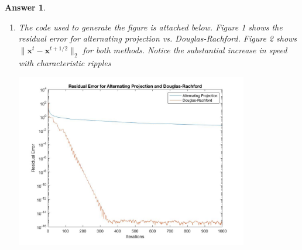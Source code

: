\documentclass[12pt]{article}
\theoremstyle{colon}
\newtheorem*{answer}{Answer}
\begin{document}
\begin{answer}
\begin{enumerate}[label=\alph*)]
			Putting it all together, the Douglas-Rachford splitting is
			\begin{gather*}
				\bm{x}^{t+1/2} = \max (0, p_i^t) \quad \forall i \\
				\bm{\lambda}^{t+1/2} = \frac{\bm{q}^t - \eta \bm{b}}{1+\eta} \\
				\begin{bmatrix}
					\bm{x}^{t+1} \\
					\bm{\lambda}^{t+1}
				\end{bmatrix} = \begin{bmatrix}
					\bm{I} & \eta \bm{A}^T \\
					-\eta \bm{A} & \bm{I}
				\end{bmatrix}^{-1} \begin{bmatrix}
					2 \bm{x}^{t+1/2} - \bm{p}^t \\
					2 \bm{\lambda}^{t+1/2} - \bm{q}^t
				\end{bmatrix} \\
				\bm{p}^{t+1} = \bm{p}^t + \bm{x}^{t+1} - \bm{x}^{t+1/2} \\
				\bm{q}^{t+1} = \bm{q}^t + \bm{\lambda}^{t+1} - \bm{\lambda}^{t+1/2}
			\end{gather*}

		\item The code used to generate the figure is attached below. Figure 1 shows the residual error for alternating projection vs. Douglas-Rachford. Figure 2 shows $\lVert \bm{x}^t - \bm{x}^{t+1/2} \rVert_2$ for both methods. Notice the substantial increase in speed with characteristic ripples

			\begin{center}
		        \includegraphics[width=0.8\textwidth]{6b.jpg}
			\end{center}


\end{enumerate}
\end{answer}
\end{document}
